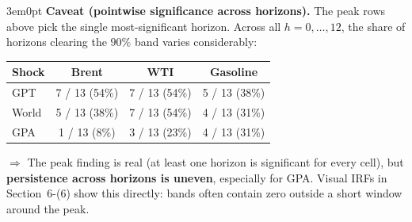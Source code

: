 \documentclass[12pt]{article}
\newenvironment{bodyL2}{\begin{adjustwidth}{3em}{0pt}}{\end{adjustwidth}}
\begin{document}
\begin{bodyL2}
\smallskip
\textbf{Caveat (pointwise significance across horizons).}
The peak rows above pick the single most-significant horizon. Across all
$h = 0, \ldots, 12$, the share of horizons clearing the $90\%$ band varies
considerably:

\begin{center}
\renewcommand{\arraystretch}{1.15}
\small
\begin{tabular}{lccc}
\toprule
Shock & Brent & WTI & Gasoline \\
\midrule
GPT   & 7 / 13 (54\%) & 7 / 13 (54\%) & 5 / 13 (38\%) \\
World & 5 / 13 (38\%) & 7 / 13 (54\%) & 4 / 13 (31\%) \\
GPA   & 1 / 13 (8\%)  & 3 / 13 (23\%) & 4 / 13 (31\%) \\
\bottomrule
\end{tabular}
\end{center}
$\Rightarrow$ The peak finding is real (at least one horizon is significant for
every cell), but \textbf{persistence across horizons is uneven}, especially for
GPA. Visual IRFs in Section~6-(6) show this directly: bands often contain zero
outside a short window around the peak.
\end{bodyL2}
\end{document}
